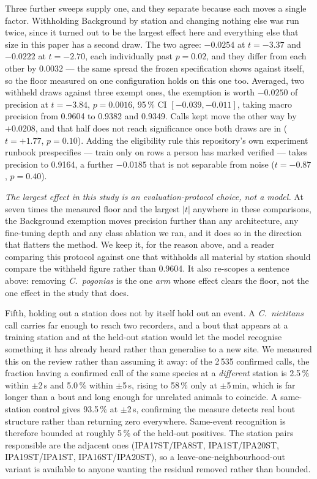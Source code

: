 \documentclass[review,3p,times]{elsarticle}
\begin{document}
Three further sweeps supply one, and they separate because each moves a single
factor. Withholding Background by station and changing nothing else was run
twice, since it turned out to be the largest effect here and everything else
that size in this paper has a second draw. The two agree: $-0.0254$ at
$t = -3.37$ and $-0.0222$ at $t = -2.70$, each individually past $p = 0.02$, and
they differ from each other by $0.0032$ --- the same spread the frozen
specification shows against itself, so the floor measured on one configuration
holds on this one too. Averaged, two withheld draws against three exempt ones,
the exemption is worth $-0.0250$ of precision at $t = -3.84$, $p = 0.0016$,
95\,\% CI $[-0.039, -0.011]$, taking macro precision from 0.9604 to 0.9382 and
0.9349. Calls kept move the other way by $+0.0208$, and that half does not reach
significance once both draws are in ($t = +1.77$, $p = 0.10$). Adding the
eligibility rule this repository's own experiment runbook prespecifies --- train
only on rows a person has marked verified --- takes precision to 0.9164, a
further $-0.0185$ that is not separable from noise ($t = -0.87$, $p = 0.40$).

\emph{The largest effect in this study is an evaluation-protocol choice, not a
model.} At seven times the measured floor and the largest $|t|$ anywhere in
these comparisons, the Background exemption moves precision further than any
architecture, any fine-tuning depth and any class ablation we ran, and it does
so in the direction that flatters the method. We keep it, for the reason above,
and a reader comparing this protocol against one that withholds all material by
station should compare the withheld figure rather than 0.9604. It also re-scopes a sentence
above: removing \textit{C.\ pogonias} is the one \emph{arm} whose effect clears
the floor, not the one effect in the study that does.

Fifth, holding out a station does not by itself hold out an event. A
\textit{C.\ nictitans} call carries far enough to reach two recorders, and a bout
that appears at a training station and at the held-out station would let the
model recognise something it has already heard rather than generalise to a new
site. We measured this on the review rather than assuming it away: of the 2\,535
confirmed calls, the fraction having a confirmed call of the same species at a
\emph{different} station is 2.5\,\% within $\pm$2\,s and 5.0\,\% within
$\pm$5\,s, rising to 58\,\% only at $\pm$5\,min, which is far longer than a bout
and long enough for unrelated animals to coincide. A same-station control gives
93.5\,\% at $\pm$2\,s, confirming the measure detects real bout structure rather
than returning zero everywhere. Same-event recognition is therefore bounded at
roughly 5\,\% of the held-out positives. The station pairs responsible are the
adjacent ones (IPA17ST/IPA8ST, IPA1ST/IPA20ST, IPA19ST/IPA1ST,
IPA16ST/IPA20ST), so a leave-one-neighbourhood-out variant is available to anyone
wanting the residual removed rather than bounded.
\end{document}

